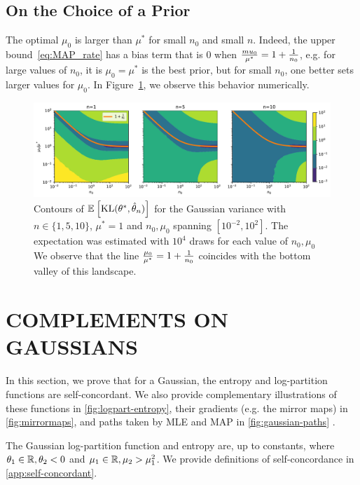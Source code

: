 \documentclass[twoside]{article}
\newcommand*{\expect}[2][]{\ensuremath{\mathbb{E}_{#1} \left[ #2 \right] }} %
\newcommand{\logpart}{A}
\newcommand{\conj}{{\logpart^*}}
\newcommand{\nat}{\theta}
\newcommand{\m}{\mu}
\begin{document}
\subsection{On the Choice of a Prior}
The optimal $\mu_0$ is larger than $\mu^*$ for small $n_0$ and small $n$.
Indeed, the upper bound~\eqref{eq:MAP_rate} has a bias term that is $0$ when $\frac{mu_0}{\mu^*} = 1 + \frac{1}{n_0}$, e.g. for large values of $n_0$, it is $\mu_0=\mu^*$ is the best prior, but for small $n_0$, one better sets larger values for $\mu_0$. In Figure~\ref{fig:optimal_n0}, we observe this behavior numerically.

\begin{figure}[ht]
	\centering
	\includegraphics[width=\textwidth]{figs/optimal_n0.pdf}
	\caption{Contours of $\expect{\KL(\nat^*, \hat \nat_n)}$  for the Gaussian variance with $n\in\{1,5,10\}$, $\mu^*=1$ and $n_0, \mu_0$ spanning $[10^{-2}, 10^2]$. The expectation was estimated with $10^4$ draws for each value of $n_0, \mu_0$ We observe that the line $\frac{\mu_0}{\mu^*} = 1 + \frac{1}{n_0}$ coincides with the bottom valley of this landscape.
	}
	\label{fig:optimal_n0}
\end{figure}


\section{COMPLEMENTS ON GAUSSIANS}
\label{app:gaussian}


In this section, we prove that for a Gaussian, the entropy and log-partition functions are self-concordant.
We also provide complementary illustrations of 
these functions in \cref{fig:logpart-entropy}, 
their gradients (e.g. the mirror maps) in \cref{fig:mirrormaps},
and paths taken by MLE and MAP in \cref{fig:gaussian-paths} .

The Gaussian log-partition function and entropy are, up to constants,
\alignn{
	\logpart(\nat) &= \frac{\nat_1^2}{-4\nat_2} - \half \log(-\nat_2) \label{eq:app-logpart} \\
	\conj(\m) &= - \half \log (\mu_2 - \mu_1^2) \; , \label{eq:app-entropy}
}
where $\nat_1\in\real, \nat_2 <0$ and $\mu_1\in\mathbb{R}, \mu_2>\mu_1^2$.
We provide definitions of self-concordance in \cref{app:self-concordant}.
\end{document}
